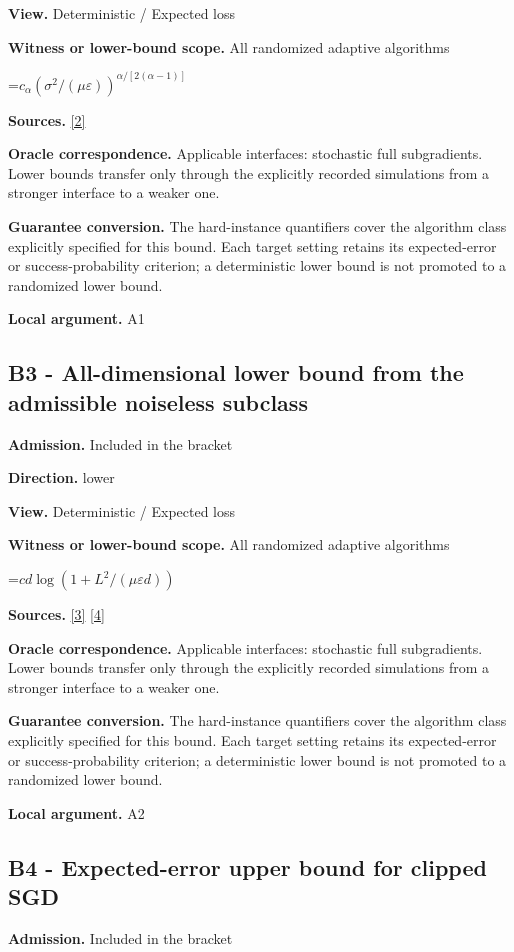 \documentclass[10pt,a4paper]{article}
\newcommand{\AtlasMath}[1]{\par\begingroup\centering\setbox0=\hbox{$\displaystyle #1$}\ifdim\wd0>1.4\linewidth\typeout{ATLAS WIDE FORMULA: \the\wd0}\fi\ifdim\wd0>\linewidth\resizebox{\linewidth}{!}{\box0}\else\box0\fi\par\endgroup}
\begin{document}
\textbf{View.} Deterministic / Expected loss

\textbf{Witness or lower-bound scope.} All randomized adaptive algorithms

\AtlasMath{c_\alpha (\sigma^2/(\mu\varepsilon))^{\alpha/[2(\alpha-1)]}}
\textbf{Sources.} \href{https://arxiv.org/pdf/2609.10874}{[2]}

\textbf{Oracle correspondence.} Applicable interfaces: stochastic full subgradients. Lower bounds transfer only through the explicitly recorded simulations from a stronger interface to a weaker one.

\textbf{Guarantee conversion.} The hard-instance quantifiers cover the algorithm class explicitly specified for this bound. Each target setting retains its expected-error or success-probability criterion; a deterministic lower bound is not promoted to a randomized lower bound.

\textbf{Local argument.} A1

\subsection{B3 - All-dimensional lower bound from the admissible noiseless subclass}
\textbf{Admission.} Included in the bracket

\textbf{Direction.} lower

\textbf{View.} Deterministic / Expected loss

\textbf{Witness or lower-bound scope.} All randomized adaptive algorithms

\AtlasMath{c d\log(1+L^2/(\mu\varepsilon d))}
\textbf{Sources.} \href{https://arxiv.org/pdf/1407.5144}{[3]} \href{https://arxiv.org/pdf/1401.1792}{[4]}

\textbf{Oracle correspondence.} Applicable interfaces: stochastic full subgradients. Lower bounds transfer only through the explicitly recorded simulations from a stronger interface to a weaker one.

\textbf{Guarantee conversion.} The hard-instance quantifiers cover the algorithm class explicitly specified for this bound. Each target setting retains its expected-error or success-probability criterion; a deterministic lower bound is not promoted to a randomized lower bound.

\textbf{Local argument.} A2

\subsection{B4 - Expected-error upper bound for clipped SGD}
\textbf{Admission.} Included in the bracket
\end{document}
